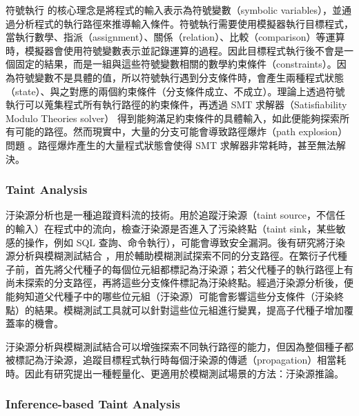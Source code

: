 符號執行 \cite{king1976symbolic} 的核心理念是將程式的輸入表示為符號變數（symbolic variables），並通過分析程式的執行路徑來推導輸入條件。符號執行需要使用模擬器執行目標程式，當執行數學、指派（assignment）、關係（relation）、比較（comparison）等運算時，模擬器會使用符號變數表示並記錄運算的過程。因此目標程式執行後不會是一個固定的結果，而是一組與這些符號變數相關的數學約束條件（constraints）。因為符號變數不是具體的值，所以符號執行遇到分支條件時，會產生兩種程式狀態（state）、與之對應的兩個約束條件（分支條件成立、不成立）。理論上透過符號執行可以蒐集程式所有執行路徑的約束條件，再透過 SMT 求解器（Satisfiability Modulo Theories solver）\cite{barrett2018satisfiability} 得到能夠滿足約束條件的具體輸入，如此便能夠探索所有可能的路徑。然而現實中，大量的分支可能會導致路徑爆炸（path explosion）問題 \cite{boonstoppel2008rwset, krishnamoorthy2010tackling}。路徑爆炸產生的大量程式狀態會使得 SMT 求解器非常耗時，甚至無法解決。

\subsubsection{Taint Analysis} %

汙染源分析也是一種追蹤資料流的技術。用於追蹤汙染源（taint source，不信任的輸入）在程式中的流向，檢查汙染源是否進入了污染終點（taint sink，某些敏感的操作，例如 SQL 查詢、命令執行），可能會導致安全漏洞。後有研究將汙染源分析與模糊測試結合 \cite{chen2018angora,rawat2017vuzzer,wang2010taintscope}，用於輔助模糊測試探索不同的分支路徑。在繁衍子代種子前，首先將父代種子的每個位元組都標記為汙染源；若父代種子的執行路徑上有尚未探索的分支路徑，再將這些分支條件標記為汙染終點。經過汙染源分析後，便能夠知道父代種子中的哪些位元組（汙染源）可能會影響這些分支條件（汙染終點）的結果。模糊測試工具就可以針對這些位元組進行變異，提高子代種子增加覆蓋率的機會。

汙染源分析與模糊測試結合可以增強探索不同執行路徑的能力，但因為整個種子都被標記為汙染源，追蹤目標程式執行時每個汙染源的傳遞（propagation）相當耗時。因此有研究提出一種輕量化、更適用於模糊測試場景的方法：汙染源推論。
\fi

\subsubsection{Inference-based Taint Analysis} %

